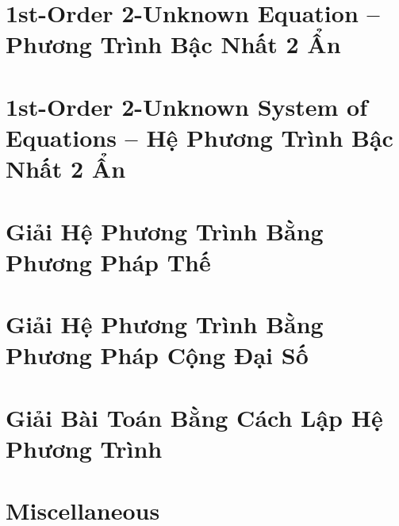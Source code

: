 \documentclass{article}
\begin{document}
\section{1st-Order 2-Unknown Equation -- Phương Trình Bậc Nhất 2 Ẩn}


\section{1st-Order 2-Unknown System of Equations -- Hệ Phương Trình Bậc Nhất 2 Ẩn}


\section{Giải Hệ Phương Trình Bằng Phương Pháp Thế}


\section{Giải Hệ Phương Trình Bằng Phương Pháp Cộng Đại Số}


\section{Giải Bài Toán Bằng Cách Lập Hệ Phương Trình}
	

\section{Miscellaneous}


\printbibliography[heading=bibintoc]
	
\end{document}
